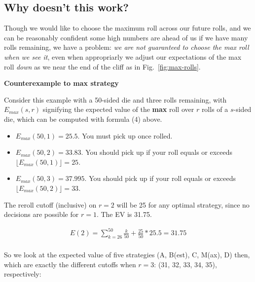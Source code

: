 \documentclass[11pt, oneside]{article} 	%
\begin{document}
\subsection{Why doesn't this work?}

Though we would like to choose the maximum roll across our future rolls, and we can be reasonably confident some high numbers are ahead of us if we have many rolls remaining, we have a problem: \emph{we are not guaranteed to choose the max roll when we see it}, even when appropriarly we adjust our expectations of the max roll \emph{down} as we near the end of the cliff as in Fig.~\ref{fig:max-rolls}.

\textbf{Counterexample to max strategy}

Consider this example with a 50-sided die and three rolls remaining, with $E_{max}(s, r)$ signifying the expected value of the \textbf{max} roll over $r$ rolls of a $s$-sided die, which can be computed with formula (4) above.

\begin{itemize}
\item $E_{max}(50, 1) = 25.5$.  You must pick up once rolled.
\item $E_{max}(50,2) = 33.83$.  You should pick up if your roll equals or exceeds $\lfloor E_{max}(50, 1)\rfloor = 25$.
\item $E_{max}(50,3) = 37.995$.  You should pick up if your roll equals or exceeds $\lfloor E_{max}(50,2) \rfloor = 33$.
\end{itemize}
 

\begin{comment}
 \textbf{best strategy}
\begin{itemize}
\item 25.5 - no cutoff
\item 31.75 - cutoff 25
\item 35.625 - cutoff 31
\end{itemize}
\end{comment}

The reroll cutoff (inclusive) on $r=2$ will be 25 for any optimal strategy, since no decisions are possible for $r=1$.   The EV is 31.75.

\begin{align}
E(2)  = \sum_{k=26}^{50} \frac{k}{50} + \frac{25}{50}*25.5 = 31.75 \\
\end{align}

So we look at the expected value of five strategies (A, B(est), C, M(ax), D) then, which are exactly the different cutoffs when $r=3$: (31, 32, 33, 34, 35), respectively:
\end{document}
